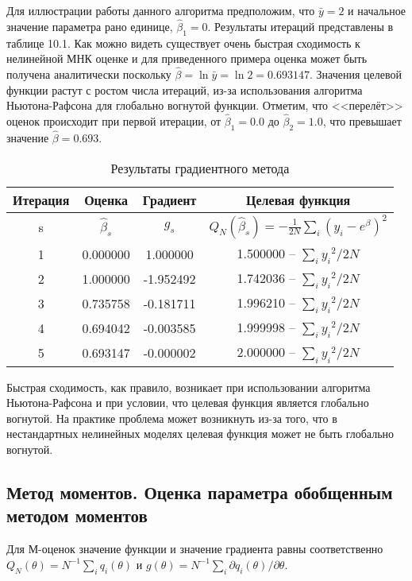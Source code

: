 Для иллюстрации работы данного алгоритма предположим, что $\bar{y}=2$ и начальное значение параметра рано единице, $\hat{\beta}_{1}=0$. Результаты итераций представлены в таблице 10.1. Как можно видеть существует очень быстрая сходимость к нелинейной МНК оценке и для приведенного примера оценка может быть получена аналитически поскольку $\hat{\beta} = \ln \bar{y} = \ln 2 = 0.693147$. Значения целевой функции растут с ростом числа итераций, из-за использования алгоритма Ньютона-Рафсона для глобально вогнутой функции. Отметим, что <<перелёт>> оценок происходит при первой итерации, от $\hat{\beta}_1 = 0.0$ до $\hat{\beta}_2 = 1.0$, что превышает значение $\hat{\beta} = 0.693$.

\begin{table}[h]
\begin{center}
\caption{\label{tab:pred} Результаты градиентного метода}
\begin{tabular}{cccc}
\hline 
\hline
Итерация & Оценка & Градиент & Целевая функция \\ 
\hline 
s & $\hat{\beta}_s$& $g_s$ & $Q_N(\hat{\beta}_s)=-\frac{1}{2N}\sum_i(y_i-e^{\beta})^2$ \\ 
1 & 0.000000& 1.000000& 1.500000 -- $\sum_i{y_i}^2/2N$ \\ 
2 & 1.000000 & -1.952492 & 1.742036 -- $\sum_i{y_i}^2/2N$ \\ 
3 & 0.735758 & -0.181711 & 1.996210 -- $\sum_i{y_i}^2/2N$ \\ 
4 & 0.694042 & -0.003585 & 1.999998 -- $\sum_i{y_i}^2/2N$ \\ 
5 & 0.693147 & -0.000002 & 2.000000 -- $\sum_i{y_i}^2/2N$ \\ 
\hline 
\hline
\end{tabular} 
\end{center}
\end{table}

Быстрая сходимость, как правило, возникает при использовании алгоритма Ньютона-Рафсона и при условии, что целевая функция является глобально вогнутой. На практике проблема может возникнуть из-за того, что в нестандартных нелинейных моделях целевая функция может не быть глобально вогнутой.

\subsection{Метод моментов. Оценка параметра обобщенным методом моментов}

Для М-оценок значение функции и значение градиента равны соответственно $Q_N(\theta)=N^{-1}\sum_iq_i(\theta)$ и $g(\theta)=N^{-1}\sum_{i}\partial{q_i}(\theta)/\partial{\theta}$.

